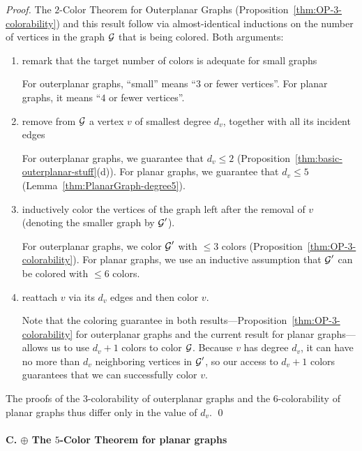 \begin{proof}
The $2$-Color Theorem for Outerplanar Graphs (Proposition~\ref{thm:OP-3-colorability}) 
and this result follow via almost-identical inductions on the number of vertices in the graph $\mbox{$\cal G$}$
that is being colored.  Both arguments:
\begin{enumerate}
\item
remark that the target number of colors is adequate for small graphs

For outerplanar graphs, ``small'' means ``$3$ or fewer vertices''.  For
planar graphs, it means ``$4$ or fewer vertices''.

\item
remove from $\mbox{$\cal G$}$ a vertex $v$ of smallest degree $d_v$, together with
all its incident edges

For outerplanar graphs, we guarantee that $d_v \leq 2$ (Proposition~\ref{thm:basic-outerplanar-stuff}(d)).
For planar graphs, we guarantee that $d_v \leq 5$ (Lemma~\ref{thm:PlanarGraph-degree5}).

\item
inductively color the vertices of the graph left after the removal of $v$ (denoting the smaller
graph by $\mbox{$\cal G$}'$).

For outerplanar graphs, we color $\mbox{$\cal G$}'$ with $\leq 3$ colors (Proposition~\ref{thm:OP-3-colorability}).
For planar graphs, we use an inductive assumption that $\mbox{$\cal G$}'$ can be colored with $\leq 6$ colors. 

\item
reattach $v$ via its $d_v$ edges and then color $v$.

Note that the coloring guarantee in both results---Proposition~\ref{thm:OP-3-colorability}
for outerplanar graphs and the current result for planar graphs---allows us to use $d_v +1$ colors 
to color $\mbox{$\cal G$}$.  Because $v$ has degree $d_v$, it can have no more than $d_v$ neighboring 
vertices in $\mbox{$\cal G$}'$, so our access to $d_v +1$ colors guarantees that we can successfully color $v$.
\end{enumerate}
The proofs of the $3$-colorability of outerplanar graphs and the
$6$-colorability of planar graphs thus differ only in the value of
$d_v$.  \qed
\end{proof}

\bigskip

\paragraph{C. $\oplus$ The $5$-Color Theorem for planar graphs}

